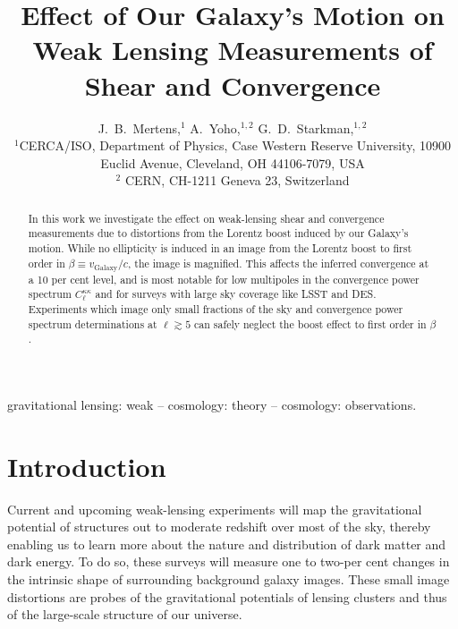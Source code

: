 \documentclass[useAMS,fleqn,usenatbib]{mn2e}
\begin{document}
\title[Lorentz-boost effects on shear and convergence]{Effect of Our Galaxy's Motion on Weak Lensing Measurements of Shear and Convergence}

\author[Mertens J.~B., Yoho A., and Starkman G. D.]{J.~B.~Mertens,$^1$ A.~Yoho,$^{1,2}$ 
G.~D.~Starkman,$^{1,2}$ \\
$^1$CERCA/ISO, Department of Physics, Case Western Reserve University,
10900 Euclid Avenue, Cleveland, OH 44106-7079, USA\\
$^{2}$ CERN, CH-1211 Geneva 23, Switzerland}


\maketitle
\begin{abstract}
In this work we investigate the effect on weak-lensing shear and convergence
measurements due to distortions from the Lorentz boost induced by our Galaxy's motion.
While no ellipticity is induced in an image from the Lorentz boost to first order in 
$\beta\equiv v_{\text{Galaxy}}/c$, the image is magnified.
This affects the inferred convergence at a 10 per cent level, and is most notable for low
multipoles in the convergence power spectrum $C^{\kappa\kappa}_{\ell}$ and  for surveys with
large sky coverage like LSST and DES. Experiments which image only small fractions of
the sky and convergence power spectrum determinations at $\ell\gtrsim 5$ can safely
neglect the boost effect to first order in $\beta$.
\end{abstract}

\begin{keywords}
gravitational lensing: weak -- cosmology: theory -- cosmology: observations.
\end{keywords}
 

\section{Introduction}

Current and upcoming weak-lensing experiments  will map the gravitational potential of structures
out to moderate redshift over most of the sky, thereby enabling us to learn more about the 
nature and distribution of dark matter and dark energy.
To do so, these surveys will measure one to two-per cent changes in the intrinsic shape of surrounding background galaxy images. 
These small image distortions are probes of the 
gravitational potentials of lensing  clusters and thus of the  large-scale structure of our universe. 
\end{document}
